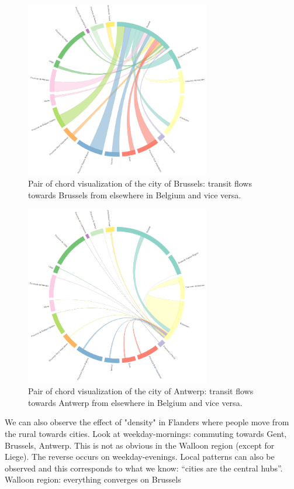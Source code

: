 \documentclass{sig-alternate}
\begin{document}
\begin{figure}
\centering
\includegraphics[width=8.1cm,align=center]{brussels}
\caption{Pair of chord visualization of the city of Brussels: transit flows towards Brussels from elsewhere in Belgium and vice versa.}
\label{fig:brussels}
\end{figure}

\begin{figure}
\centering
\includegraphics[width=8.1cm,align=center]{antwerp}
\caption{Pair of chord visualization of the city of Antwerp: transit flows towards Antwerp from elsewhere in Belgium and vice versa.}
\label{fig:antwerp}
\end{figure}

We can also observe the effect of "density" in Flanders where people move from the rural towards cities. Look at weekday-mornings: commuting towards Gent, Brussels, Antwerp. This is not as obvious in the Walloon region (except for Liege). The reverse occurs on weekday-evenings. Local patterns can also be observed and this corresponds to what we know: ``cities are the central hubs''.
Walloon region: everything converges on Brussels
\end{document}
